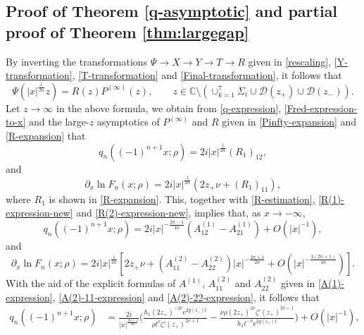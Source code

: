 \documentclass[11pt,a4paper]{article}
\numberwithin{equation}{section}
\begin{document}
\subsection{Proof of Theorem \ref{q-asymptotic} and partial proof of Theorem \ref{thm:largegap}}\label{subsec:proof1}
By inverting the transformations $\Psi\to{X}\to{Y}\to{T}\to{R}$ given in \eqref{rescaling},  \eqref{Y-transformation}, \eqref{T-transformation} and \eqref{Final-transformation}, it follows that
\begin{equation}
\Psi\left(|x|^{\frac{1}{2n}}z\right)
=R(z)P^{(\infty)}(z),\qquad z\in\mathbb{C}\setminus (\cup_{k=1}^7\Sigma_i \cup  \mathcal{D}(z_+)\cup  \mathcal{D}(z_-)).
\end{equation}
Let $z\to \infty$ in the above formula, we obtain from \eqref{q-expression}, \eqref{Fred-expression-to-x} and the large-$z$ asymptotics of $P^{(\infty)}$ and $R$ given in \eqref{Pinfty-expansion} and \eqref{R-expansion} that
\begin{equation}\label{q0}
q_n\left((-1)^{n+1}x;\rho\right)=2i|x|^{\frac{1}{2n}}(R_1)_{12},
\end{equation}
and
\begin{equation}\label{F_x}
\partial_x\ln{F}_n(x;\rho)=2i|x|^{\frac{1}{2n}}\left(2z_+\nu+(R_1)_{11}\right),
\end{equation}
where $R_1$ is shown in \eqref{R-expansion}. This, together with \eqref{R-estimation}, \eqref{R(1)-expression-new} and \eqref{R(2)-expression-new}, implies that, as $x\to-\infty$,
\begin{equation}\label{q0-1}
q_n\left((-1)^{n+1}x;\rho\right)=2i|x|^{-\frac{2n-1}{4n}}
\left(A^{(1)}_{12}-A^{(1)}_{21}\right)+O\left(|x|^{-1}\right),
\end{equation}
and
\begin{equation}\label{F_x-1}
\partial_x\ln{F}_n(x;\rho)=2i|x|^{\frac{1}{2n}}
\left[2z_+\nu+\left(A^{(2)}_{11}-A^{(2)}_{22}\right)|x|^{-\frac{2n+1}{2n}}
+O\left(|x|^{-\frac{3(2n+1)}{4n}}\right)\right].
\end{equation}
With the aid of the explicit formulas of $A^{(1)}$, $A^{(2)}_{11}$ and $A^{(2)}_{22}$ given in \eqref{A(1)-expression}, \eqref{A(2)-11-expression} and \eqref{A(2)-22-expression}, it follows that
\begin{align}\label{q0-2}
q_n\left((-1)^{n+1}x;\rho\right)&=\frac{2i}{|x|^{\frac{2n-1}{4n}}}\Bigg(
\frac{h_1(2z_+)^{-2\nu}\mathrm{e}^{2g(z_+)t}}
{\rho{t}^{\nu}\zeta'(z_+)^{2\nu+1}}-\frac{\nu\rho(2z_+)^{2\nu}\zeta'(z_+)^{2\nu-1}}
{h_1t^{-\nu}\mathrm{e}^{2g(z_+)t}}
\Bigg)+O\left(|x|^{-1}\right),
\end{align}
\end{document}
